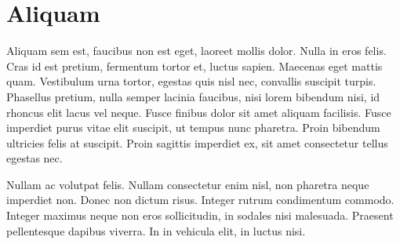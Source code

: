 \chapter{Aliquam}

Aliquam sem est, faucibus non est eget, laoreet mollis dolor. Nulla in eros felis. Cras id est pretium, fermentum tortor et, luctus sapien. Maecenas eget mattis quam. Vestibulum urna tortor, egestas quis nisl nec, convallis suscipit turpis. Phasellus pretium, nulla semper lacinia faucibus, nisi lorem bibendum nisi, id rhoncus elit lacus vel neque. Fusce finibus dolor sit amet aliquam facilisis. Fusce imperdiet purus vitae elit suscipit, ut tempus nunc pharetra. Proin bibendum ultricies felis at suscipit. Proin sagittis imperdiet ex, sit amet consectetur tellus egestas nec.

Nullam ac volutpat felis. Nullam consectetur enim nisl, non pharetra neque imperdiet non. Donec non dictum risus. Integer rutrum condimentum commodo. Integer maximus neque non eros sollicitudin, in sodales nisi malesuada. Praesent pellentesque dapibus viverra. In in vehicula elit, in luctus nisi.
